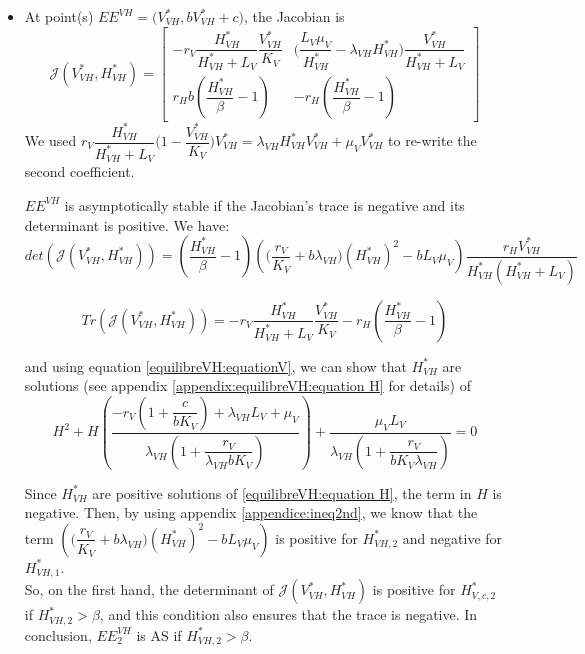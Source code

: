 \documentclass{article}
\newcommand{\lv}{\lambda_{VH}}
\begin{document}
\begin{itemize}
\item At point(s) $EE^{VH} = \Big(V^*_{VH}, b V^*_{VH} + c)$, the Jacobian is
\begin{equation}
\mathcal{J}(V^*_{VH}, H^*_{VH}) = \begin{bmatrix}
-r_V\dfrac{H^*_{VH}}{H^*_{VH} + L_V} \dfrac{V^*_{VH}}{K_V} & \Big(\dfrac{L_V\mu_V}{H^*_{VH}} - \lv H^*_{VH}) \dfrac{V^*_{VH}}{H^*_{VH} + L_V} \\
r_H b (\dfrac{H^*_{VH}}{\beta} - 1) & -r_H(\dfrac{H^*_{VH}}{\beta} - 1)
\end{bmatrix}
\label{stabilityVH:jacobianVH}
\end{equation}
We used $r_V \dfrac{H^*_{VH}}{H^*_{VH} + L_V} \Big(1 - \dfrac{V^*_{VH}}{K_V} \Big)V^*_{VH} = \lv H^*_{VH} V^*_{VH} + \mu_VV^*_{VH}$ to re-write the second coefficient.

$EE^{VH}$ is asymptotically stable if the Jacobian's trace is negative and its determinant is positive. We have:
\begin{equation}
det(\mathcal{J}(V^*_{VH}, H^*_{VH})) = (\dfrac{H^*_{VH}}{\beta} - 1) \left( \Big(\dfrac{r_V}{K_V} + b\lv\Big) (H^*_{VH})^2 - b L_V \mu_V \right) \dfrac{r_H V^*_{VH}}{H^*_{VH}(H^*_{VH} + L_V)}
\end{equation}

\begin{equation}
Tr(\mathcal{J}(V^*_{VH}, H^*_{VH})) = -r_V  \dfrac{H^*_{VH}}{H^*_{VH}+L_V}\dfrac{V^*_{VH}}{K_V} - r_H(\dfrac{H^*_{VH}}{\beta} - 1)
\end{equation}

and using equation \eqref{equilibreVH:equationV}, we can show that $H^*_{VH}$ are solutions (see appendix \ref{appendix:equilibreVH:equation H} for details) of
\begin{equation}
H^2 + H \left( \dfrac{-r_V(1 + \dfrac{c}{bK_V}) + \lv L_V + \mu_V}{\lv(1 + \dfrac{r_V}{\lv bK_V})} \right) + \dfrac{\mu_V L_V}{\lv(1 + \dfrac{r_V}{bK_V\lv})} = 0
\label{equilibreVH:equation H}
\end{equation}

Since $H^*_{VH}$ are positive solutions of \eqref{equilibreVH:equation H}, the term in $H$ is negative. Then, by using appendix \ref{appendice:ineq2nd}, we know that the term $\left( \Big(\dfrac{r_V}{K_V} + b\lv\Big) (H^*_{VH})^2 - b L_V \mu_V \right)$ is positive for $H^*_{VH, 2}$ and negative for $H^*_{VH, 1}$.
\\

So, on the first hand, the determinant of $\mathcal{J}(V^*_{VH}, H^*_{VH})$ is positive for $H^*_{V, c, 2}$ if $H^*_{VH, 2} > \beta$, and this condition also ensures that the trace is negative. In conclusion, $EE^{VH}_2$ is AS if $H^*_{VH, 2} > \beta$.
\\


\end{itemize}
\end{document}
